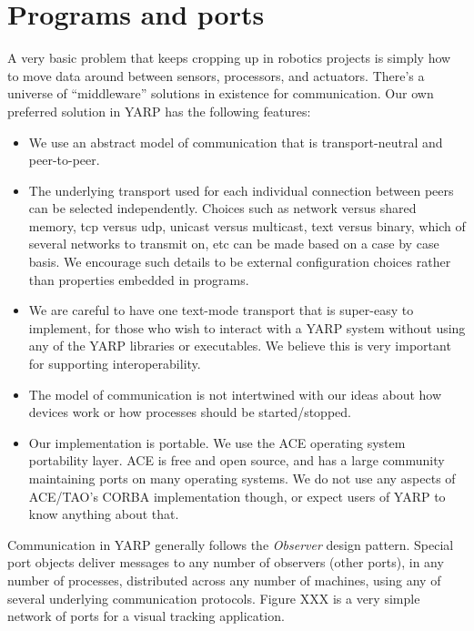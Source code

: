 
\section{Programs and ports}

A very basic problem that keeps cropping up in robotics projects is
simply how to move data around between sensors, processors,
and actuators.  There's a universe of ``middleware'' solutions
in existence for communication.  Our own preferred solution
in YARP has the following features:

\begin{itemize}

\item We use an abstract model of communication that is
transport-neutral and peer-to-peer.

\item The underlying transport used for each individual connection
between peers can be selected independently.  Choices such as network
versus shared memory, tcp versus udp, unicast versus multicast, text
versus binary, which of several networks to transmit on, etc can be
made based on a case by case basis.  We encourage such details to be
external configuration choices rather than properties embedded in
programs.

\item We are careful to have one text-mode transport that is
super-easy to implement, for those who wish to interact with a YARP
system without using any of the YARP libraries or executables.  We
believe this is very important for supporting interoperability.

\item The model of communication is not intertwined with our
ideas about how devices work or how processes should be started/stopped.

\item Our implementation is portable.  We use the ACE operating system
portability layer.  ACE is free and open source, and has a large
community maintaining ports on many operating systems.  We do not use
any aspects of ACE/TAO's CORBA implementation though, or expect users
of YARP to know anything about that.

\end{itemize}

Communication in YARP generally follows the {\it Observer} design
pattern. Special port objects deliver messages to any number of
observers (other ports), in any number of processes, distributed
across any number of machines, using any of several underlying
communication protocols. Figure XXX is a very simple network of ports
for a visual tracking application.






